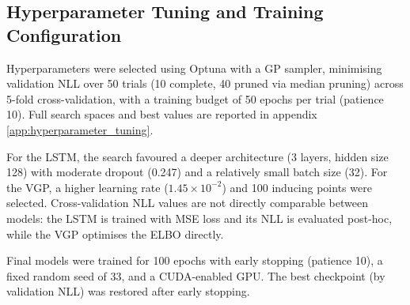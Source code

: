 \subsection{Hyperparameter Tuning and Training Configuration}

Hyperparameters were selected using Optuna \parencite{optuna_2019} with a GP sampler, minimising validation NLL over 50 trials (10 complete, 40 pruned via median pruning) across 5-fold cross-validation, with a training budget of 50 epochs per trial (patience 10). Full search spaces and best values are reported in appendix \ref{app:hyperparameter_tuning}.

For the LSTM, the search favoured a deeper architecture (3 layers, hidden size 128) with moderate dropout (0.247) and a relatively small batch size (32). For the VGP, a higher learning rate ($1.45 \times 10^{-2}$) and 100 inducing points were selected. Cross-validation NLL values are not directly comparable between models: the LSTM is trained with MSE loss and its NLL is evaluated post-hoc, while the VGP optimises the ELBO directly.

Final models were trained for 100 epochs with early stopping (patience 10), a fixed random seed of 33, and a CUDA-enabled GPU. The best checkpoint (by validation NLL) was restored after early stopping.

